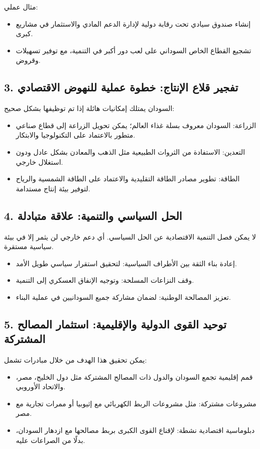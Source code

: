 \documentclass[12pt]{article}
\begin{document}
مثال عملي:
\begin{itemize}
    \item إنشاء صندوق سيادي تحت رقابة دولية لإدارة الدعم المادي والاستثمار في مشاريع كبرى.
    \item تشجيع القطاع الخاص السوداني على لعب دور أكبر في التنمية، مع توفير تسهيلات وقروض.
\end{itemize}

\subsection*{3. تفجير قلاع الإنتاج: خطوة عملية للنهوض الاقتصادي}
السودان يمتلك إمكانيات هائلة إذا تم توظيفها بشكل صحيح:
\begin{itemize}
    \item الزراعة: السودان معروف بسلة غذاء العالم؛ يمكن تحويل الزراعة إلى قطاع صناعي متطور بالاعتماد على التكنولوجيا والابتكار.
    \item التعدين: الاستفادة من الثروات الطبيعية مثل الذهب والمعادن بشكل عادل ودون استغلال خارجي.
    \item الطاقة: تطوير مصادر الطاقة التقليدية والاعتماد على الطاقة الشمسية والرياح لتوفير بيئة إنتاج مستدامة.
\end{itemize}

\subsection*{4. الحل السياسي والتنمية: علاقة متبادلة}
لا يمكن فصل التنمية الاقتصادية عن الحل السياسي. أي دعم خارجي لن يثمر إلا في بيئة سياسية مستقرة.
\begin{itemize}
    \item إعادة بناء الثقة بين الأطراف السياسية: لتحقيق استقرار سياسي طويل الأمد.
    \item وقف النزاعات المسلحة: وتوجيه الإنفاق العسكري إلى التنمية.
    \item تعزيز المصالحة الوطنية: لضمان مشاركة جميع السودانيين في عملية البناء.
\end{itemize}

\subsection*{5. توحيد القوى الدولية والإقليمية: استثمار المصالح المشتركة}
يمكن تحقيق هذا الهدف من خلال مبادرات تشمل:
\begin{itemize}
    \item قمم إقليمية تجمع السودان والدول ذات المصالح المشتركة مثل دول الخليج، مصر، والاتحاد الأوروبي.
    \item مشروعات مشتركة: مثل مشروعات الربط الكهربائي مع إثيوبيا أو ممرات تجارية مع مصر.
    \item دبلوماسية اقتصادية نشطة: لإقناع القوى الكبرى بربط مصالحها مع ازدهار السودان، بدلًا من الصراعات عليه.
\end{itemize}
\end{document}
